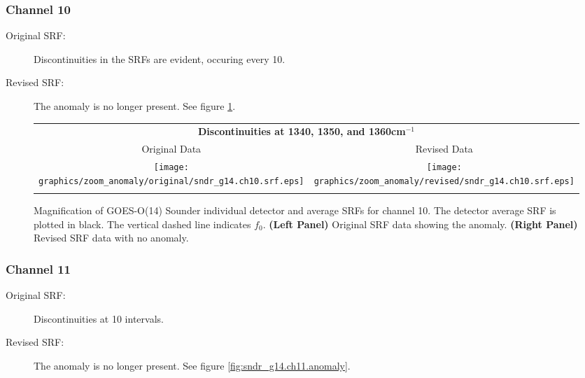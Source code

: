 \subsubsection{Channel 10}
\begin{description}
  \item[Original SRF:] Discontinuities in the SRFs are evident, occuring every 10\invcm.
  \item[Revised SRF:]  The anomaly is no longer present. See figure \ref{fig:sndr_g14.ch10.anomaly}.
\end{description}

\begin{figure}[htp]
  \centering
  \begin{tabular}{c c}
    \multicolumn{2}{c}{\textsf{\bfseries Discontinuities at 1340, 1350, and 1360cm$^{-1}$}} \\
    \hspace{1.5em}\textsf{Original Data} &
    \hspace{1.5em}\textsf{Revised Data} \\
    \texttt{[image: graphics/zoom\_anomaly/original/sndr\_g14.ch10.srf.eps]} &
    \texttt{[image: graphics/zoom\_anomaly/revised/sndr\_g14.ch10.srf.eps]} \\\\
  \end{tabular}
  \caption{Magnification of GOES-O(14) Sounder individual detector and average SRFs for channel 10. The detector average SRF is plotted in black. The vertical dashed line indicates $f_0$. \textbf{(Left Panel)} Original SRF data showing the anomaly. \textbf{(Right Panel)} Revised SRF data with no anomaly.}
  \label{fig:sndr_g14.ch10.anomaly}
\end{figure}

\subsubsection{Channel 11}
\begin{description}
  \item[Original SRF:] Discontinuities at 10\invcm{} intervals.
  \item[Revised SRF:]  The anomaly is no longer present. See figure \ref{fig:sndr_g14.ch11.anomaly}.
\end{description}

